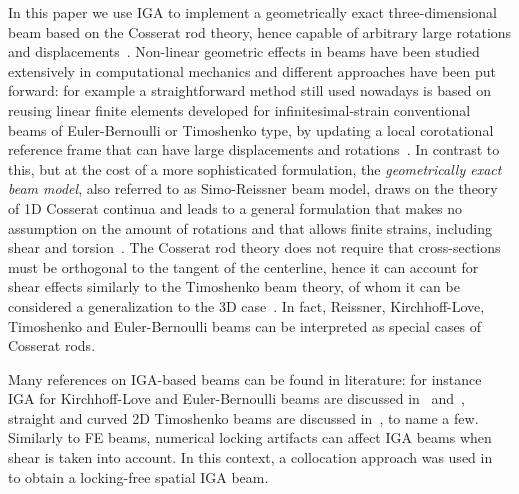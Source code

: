 \documentclass[review]{elsarticle}
\begin{document}
In this paper we use IGA to implement a geometrically exact three-dimensional beam based on the Cosserat rod theory, hence capable of arbitrary large rotations and displacements~\cite{LINN2011cosserat}. Non-linear geometric effects in beams have been studied extensively in computational mechanics and different approaches have been put forward: for example a straightforward method still used nowadays is based on reusing linear finite elements developed for infinitesimal-strain conventional beams of Euler-Bernoulli or Timoshenko type, by updating a local corotational reference frame that can have large displacements and rotations~\cite{Crisfield1990corotational,Felippa2005unified}. In contrast to this, but at the cost of a more sophisticated formulation, the \textit{geometrically exact beam model}, also referred to as Simo-Reissner beam model, draws on the theory of 1D Cosserat continua \cite{cosserat1909} and leads to a general formulation that makes no assumption on the amount of rotations and that allows finite strains, including shear and torsion~\cite{Reissner1973gebt,Antman1974,Simo1985finitestrain}.
The Cosserat rod theory does not require that cross-sections must be orthogonal to the tangent of the centerline, hence it can account for shear effects similarly to the Timoshenko beam theory, of whom it can be considered a generalization to the 3D case~\cite{Timoshenko1921Beams}. In fact, Reissner, Kirchhoff-Love, Timoshenko and Euler-Bernoulli beams can be interpreted as special cases of Cosserat rods. 

Many references on IGA-based beams can be found in literature: for instance IGA for Kirchhoff-Love and Euler-Bernoulli beams are discussed in~\cite{GRECO2013kirchhoffbeams} and~\cite{Weeger2013euler}, straight and curved 2D Timoshenko beams are discussed in~\cite{BOUCLIER2012thick}, to name a few. Similarly to FE beams, numerical locking artifacts can affect IGA beams when shear is taken into account. In this context, a collocation approach was used in~\cite{Beiraodaveiga2012IGA,Auricchio2013IGA} to obtain a locking-free spatial IGA beam. 
\end{document}
